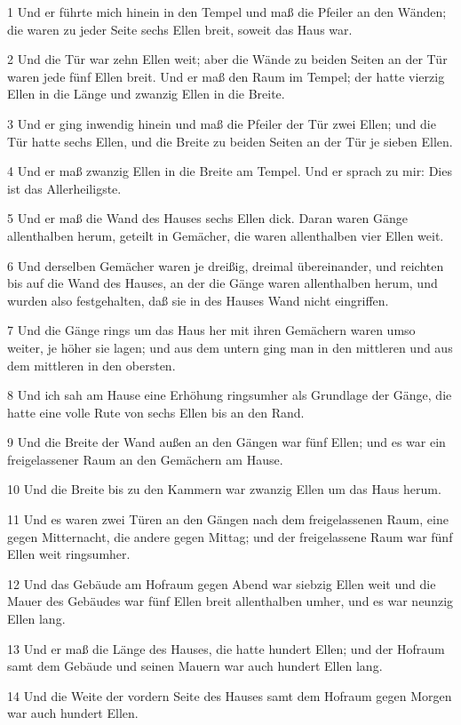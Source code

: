 \par 1 Und er führte mich hinein in den Tempel und maß die Pfeiler an den Wänden; die waren zu jeder Seite sechs Ellen breit, soweit das Haus war.
\par 2 Und die Tür war zehn Ellen weit; aber die Wände zu beiden Seiten an der Tür waren jede fünf Ellen breit. Und er maß den Raum im Tempel; der hatte vierzig Ellen in die Länge und zwanzig Ellen in die Breite.
\par 3 Und er ging inwendig hinein und maß die Pfeiler der Tür zwei Ellen; und die Tür hatte sechs Ellen, und die Breite zu beiden Seiten an der Tür je sieben Ellen.
\par 4 Und er maß zwanzig Ellen in die Breite am Tempel. Und er sprach zu mir: Dies ist das Allerheiligste.
\par 5 Und er maß die Wand des Hauses sechs Ellen dick. Daran waren Gänge allenthalben herum, geteilt in Gemächer, die waren allenthalben vier Ellen weit.
\par 6 Und derselben Gemächer waren je dreißig, dreimal übereinander, und reichten bis auf die Wand des Hauses, an der die Gänge waren allenthalben herum, und wurden also festgehalten, daß sie in des Hauses Wand nicht eingriffen.
\par 7 Und die Gänge rings um das Haus her mit ihren Gemächern waren umso weiter, je höher sie lagen; und aus dem untern ging man in den mittleren und aus dem mittleren in den obersten.
\par 8 Und ich sah am Hause eine Erhöhung ringsumher als Grundlage der Gänge, die hatte eine volle Rute von sechs Ellen bis an den Rand.
\par 9 Und die Breite der Wand außen an den Gängen war fünf Ellen; und es war ein freigelassener Raum an den Gemächern am Hause.
\par 10 Und die Breite bis zu den Kammern war zwanzig Ellen um das Haus herum.
\par 11 Und es waren zwei Türen an den Gängen nach dem freigelassenen Raum, eine gegen Mitternacht, die andere gegen Mittag; und der freigelassene Raum war fünf Ellen weit ringsumher.
\par 12 Und das Gebäude am Hofraum gegen Abend war siebzig Ellen weit und die Mauer des Gebäudes war fünf Ellen breit allenthalben umher, und es war neunzig Ellen lang.
\par 13 Und er maß die Länge des Hauses, die hatte hundert Ellen; und der Hofraum samt dem Gebäude und seinen Mauern war auch hundert Ellen lang.
\par 14 Und die Weite der vordern Seite des Hauses samt dem Hofraum gegen Morgen war auch hundert Ellen.
